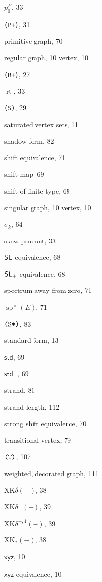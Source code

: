 \documentclass[12pt]{amsbook}%
\newcommand{\lt}{\operatorname{rt}}
\theoremstyle{defin}
\theoremstyle{remark}
\numberwithin{equation}{chapter}
\numberwithin{theor}{section}
\newcommand{\spaz}{\operatorname{sp}^\times}
\newcommand{\xyz}[1]{\mbox{$\mathsf{#1}$}}
\newcommand{\xyzrel}[1]{\mbox{$\overline{\underline{\mathsf{ #1}}}$}}
\newcommand{\RRRp}{\mbox{\texttt{\textup{(R+)}}}}
\newcommand{\PPPp}{\mbox{\texttt{\textup{(P+)}}}}
\newcommand{\SSS}{\mbox{\texttt{\textup{(S)}}}}
\newcommand{\SSSs}{\mbox{\texttt{\textup{(S*)}}}}
\newcommand{\standard}{\mathsf{std}}
\newcommand{\standardp}{\mathsf{std}^+}
\newcommand{\SL}{{\sf SL}}
\newcommand{\SLp}{\mbox{${\sf SL}_+$}}
\begin{document}
\begin{theindex}
  \indexspace

  \item $p_0^E$, 33
  \item \PPPp, 31
  \item primitive graph, 70

  \indexspace

  \item regular
    \subitem graph, 10
    \subitem vertex, 10
  \item \RRRp, 27
  \item $\lt$, 33

  \indexspace

  \item \SSS, 29
  \item saturated vertex sets, 11
  \item shadow form, 82
  \item shift equivalence, 71
  \item shift map, 69
  \item shift of finite type, 69
  \item singular
    \subitem graph, 10
    \subitem vertex, 10
  \item $\sigma_k$, 64
  \item skew product, 33
  \item $\SL$-equivalence, 68
  \item $\SLp$-equivalence, 68
  \item spectrum away from zero, 71
  \item $\spaz(E)$, 71
  \item $\SSSs$, 83
  \item standard form, 13
  \item $\standard$, 69
  \item $\standardp$, 69
  \item strand, 80
  \item strand length, 112
  \item strong shift equivalence, 70

  \indexspace

  \item transitional vertex, 79
  \item $\mbox  {\texttt  {\textup  {(T)}}}$, 107

  \indexspace

  \item weighted, decorated graph, 111

  \indexspace

  \item $\mathrm{XK}\delta(-)$, 38
  \item $\mathrm{XK}\delta^+(-)$, 39
  \item $\mathrm{XK}\delta^{+,1}(-)$, 39
  \item $\mathrm{XK}_*(-)$, 38
  \item $\xyzrel{xyz}$, 10
  \item $\xyz{xyz}$-equivalence, 10

\end{theindex}
\end{document}
